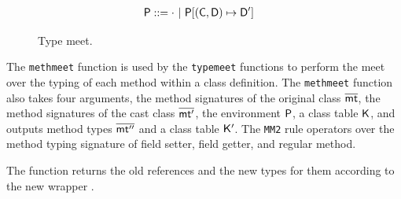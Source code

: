 \documentclass[a4paper,USenglish]{tex/lipics-v2016}
\begin{document}
\begin{figure}[!ht]
\hrulefill

\opdef{
  $\tmeet{\t}{\tp}\P\K = \tpp\,\Kp$
}{
}
\begin{align*}
\P &::= \cdot \B \Map\P{\Bind{(\C,\D)}\Dp}
\end{align*}
\begin{mathpar}




\end{mathpar}

\vspace{-2mm}
\hrulefill
\caption{Type meet.}\label{monmeet}
\end{figure}


The \texttt{methmeet} function is used by the \texttt{typemeet} functions to
perform the meet over the typing of each method within a class definition.
The \texttt{methmeet} function also takes four arguments, the method
signatures of the original class $\b\mt$, the method signatures of the cast
class $\b\mtp$, the environment $\P$, a class table $\K$, and outputs method
types $\b\mtpp$ and a class table $\Kp$. The \texttt{MM2} rule operators
over the method typing signature of field setter, field getter, and regular
method.

The function \ftypes\a\C\s\K returns the old references and the new types
for them according to the new wrapper \C.

\newcommand{\rtranstz}[4]{#1 \Rightarrow #2 \vdash #3 \looparrowright_{mon} #4}
\end{document}
